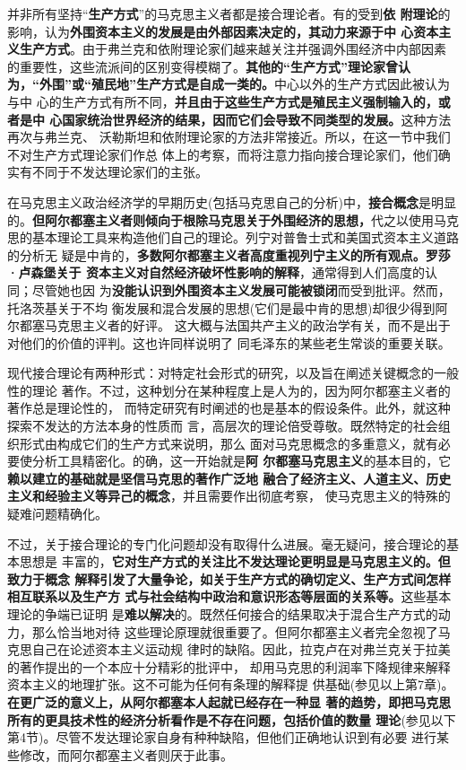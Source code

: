 并非所有坚持“\textbf{生产方式}”的马克思主义者都是接合理论者。有的受到\textbf{依
  附理论}的影响，认为\textbf{外围资本主义的发展是由外部因素决定的，其动力来源于中
  心资本主义生产方式}。由于弗兰克和依附理论家们越来越关注并强调外围经济中内部因素
的重要性，这些流派间的区别变得模糊了。\textbf{其他的“生产方式”理论家曾认
  为，“外围”或“殖民地”生产方式是自成一类的。}中心以外的生产方式因此被认为与中
心的生产方式有所不同，\textbf{并且由于这些生产方式是殖民主义强制输入的，或者是中
  心国家统治世界经济的结果，因而它们会导致不同类型的发展。}这种方法再次与弗兰克、
沃勒斯坦和依附理论家的方法非常接近。所以，在这一节中我们不对生产方式理论家们作总
体上的考察，而将注意力指向接合理论家们，他们确实有不同于不发达理论家们的主张。

在马克思主义政治经济学的早期历史(包括马克思自己的分析)中，\textbf{接合概念}是明显
的。\textbf{但阿尔都塞主义者则倾向于根除马克思关于外围经济的思想，}代之以使用马克
思的基本理论工具来构造他们自己的理论。列宁对普鲁士式和美国式资本主义道路的分析无
疑是中肯的，\textbf{多数阿尔都塞主义者高度重视列宁主义的所有观点。罗莎·卢森堡关于
  资本主义对自然经济破坏性影响的解释}，通常得到人们高度的认同；尽管她也因
为\textbf{没能认识到外围资本主义发展可能被锁闭}而受到批评。然而，托洛茨基关于不均
衡发展和混合发展的思想(它们是最中肯的思想)却很少得到阿尔都塞马克思主义者的好评。
这大概与法国共产主义的政治学有关，而不是出于对他们的价值的评判。这也许同样说明了
同毛泽东的某些老生常谈的重要关联。

现代接合理论有两种形式：对特定社会形式的研究，以及旨在阐述关键概念的一般性的理论
著作。不过，这种划分在某种程度上是人为的，因为阿尔都塞主义者的著作总是理论性的，
而特定研究有时阐述的也是基本的假设条件。此外，就这种探索不发达的方法本身的性质而
言，高层次的理论倍受尊敬。既然特定的社会组织形式由构成它们的生产方式来说明，那么
面对马克思概念的多重意义，就有必要使分析工具精密化。的确，这一开始就是\textbf{阿
  尔都塞马克思主义}的基本目的，它\textbf{赖以建立的基础就是坚信马克思的著作广泛地
  融合了经济主义、人道主义、历史主义和经验主义等异己的概念}，并且需要作出彻底考察，
使马克思主义的特殊的疑难问题精确化。

不过，关于接合理论的专门化问题却没有取得什么进展。毫无疑问，接合理论的基本思想是
丰富的，\textbf{它对生产方式的关注比不发达理论更明显是马克思主义的。但致力于概念
  解释引发了大量争论，如关于生产方式的确切定义、生产方式间怎样相互联系以及生产方
  式与社会结构中政治和意识形态等层面的关系等。}这些基本理论的争端已证明
是\textbf{难以解决}的。既然任何接合的结果取决于混合生产方式的动力，那么恰当地对待
这些理论原理就很重要了。但阿尔都塞主义者完全忽视了马克思自己在论述资本主义运动规
律时的缺陷。因此，拉克卢在对弗兰克关于拉美的著作提出的一个本应十分精彩的批评中，
却用马克思的利润率下降规律来解释资本主义的地理扩张。这不可能为任何有条理的解释提
供基础(参见以上第7章)。\textbf{在更广泛的意义上，从阿尔都塞本人起就已经存在一种显
  著的趋势，即把马克思所有的更具技术性的经济分析看作是不存在问题，包括价值的数量
  理论}(参见以下第4节)。尽管不发达理论家自身有种种缺陷，但他们正确地认识到有必要
进行某些修改，而阿尔都塞主义者则厌于此事。

